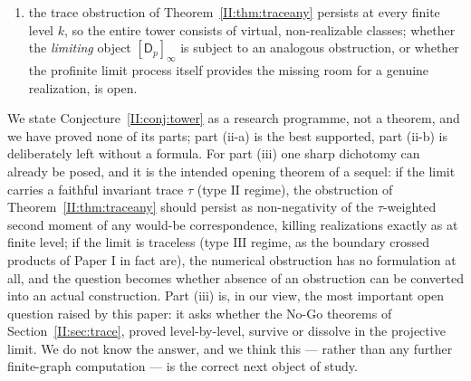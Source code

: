 \begin{conjecture}
\begin{enumerate}
\begin{itemize}
ideal of any finitely generated torsion $\Z_p[[T]]$-module. \emph{The naive
$\Z_p[[T]]$-form of this conjecture, including the tentative identification of the
Ihara variable $u$ with $1+T$ proposed in an earlier draft, is therefore withdrawn as
refuted in shape by its own model.} What we conjecture in its place is that the correct
base object for the congruence tower is the Iwahori--Hecke algebra
$\cH(\PGL_2(\Q_p),\mathcal I)$ of the tower, acting through the degeneracy
correspondences, with the finite invariants governed by a characteristic ideal over
that non-commutative base, and the observed $-k$ term arising as an Euler-characteristic
correction --- the removal of one Eisenstein rank per level --- external to the module
invariants proper. We do not know the correct precise formulation, and we prefer to say
so rather than to state a formula the data has already falsified;
\end{itemize}
\item[(iii)] the trace obstruction of Theorem~\ref{II:thm:traceany} persists at every finite
level $k$, so the entire tower consists of virtual, non-realizable classes; whether the
\emph{limiting} object $[\mathsf D_p]_\infty$ is subject to an analogous obstruction, or
whether the profinite limit process itself provides the missing room for a genuine
realization, is open.
\end{enumerate}
\end{conjecture}

\begin{remark}
We state Conjecture~\ref{II:conj:tower} as a research programme, not a theorem, and we have
proved none of its parts; part (ii-a) is the best supported, part (ii-b) is deliberately
left without a formula. For part (iii) one sharp dichotomy can already be posed, and it
is the intended opening theorem of a sequel: if the limit carries a faithful invariant
trace $\tau$ (type $\mathrm{II}$ regime), the obstruction of
Theorem~\ref{II:thm:traceany} should persist as non-negativity of the $\tau$-weighted
second moment of any would-be correspondence, killing realizations exactly as at finite
level; if the limit is traceless (type $\mathrm{III}$ regime, as the boundary crossed
products of Paper I in fact are), the numerical obstruction has no formulation at all,
and the question becomes whether absence of an obstruction can be converted into an
actual construction. Part (iii) is, in our view, the most important open
question raised by this paper: it asks whether the No-Go theorems of
Section~\ref{II:sec:trace}, proved level-by-level, survive or dissolve in the projective
limit. We do not know the answer, and we think this --- rather than any further
finite-graph computation --- is the correct next object of study.
\end{remark}

